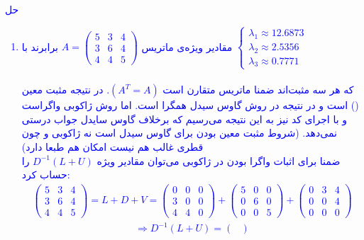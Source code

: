 \textcolor{blue}{
حل
\\
\begin{enumerate}
\item
مقادیر ویژه‌ی ماتریس
$A = \begin{pmatrix}
    5 & 3 & 4 \\
    3 & 6 & 4 \\
    4 & 4 & 5
\end{pmatrix}$
برابرند با
$
\begin{cases}
    \lambda_1 \approx 12.6873 \\
    \lambda_2 \approx 2.5356 \\
    \lambda_3 \approx 0.7771
\end{cases}
$
\\ \\
که هر سه مثبت‌اند ضمنا
ماتریس متقارن است
$(A^T = A)$.
در نتیجه مثبت معین 
()
است و در نتیجه در روش گاوس سیدل همگرا است. اما روش 
ژاکوبی واگراست و با اجرای کد نیز به این نتیجه می‌رسیم که برخلاف گاوس سایدل جواب درستی نمی‌دهد. (شروط مثبت معین بودن برای گاوس سیدل است نه ژاکوبی و چون قطری غالب هم نیست امکان
هم طبعا دارد)
\\
ضمنا برای اثبات واگرا بودن در ژاکوبی می‌توان مقادیر ویژه
$D^{-1} (L + U)$
را حساب کرد:
\begin{align*}
    \begin{pmatrix}
        5 & 3 & 4 \\
        3 & 6 & 4 \\
        4 & 4 & 5
    \end{pmatrix} = L +D + V = 
    \begin{pmatrix}
        0 & 0 & 0 \\
        3 & 0 & 0 \\
        4 & 4 & 0
    \end{pmatrix} + 
    \begin{pmatrix}
        5 & 0 & 0 \\
        0 & 6 & 0 \\
        0 & 0 & 5
    \end{pmatrix} +
    \begin{pmatrix}
        0 & 3 & 4 \\
        0 & 0 & 4 \\
        0 & 0 & 0
    \end{pmatrix}
\end{align*}
\begin{align*}
    \Rightarrow D^{-1} (L + U) = \begin{pmatrix}

\end{pmatrix}
\end{align*}
\end{enumerate}}
